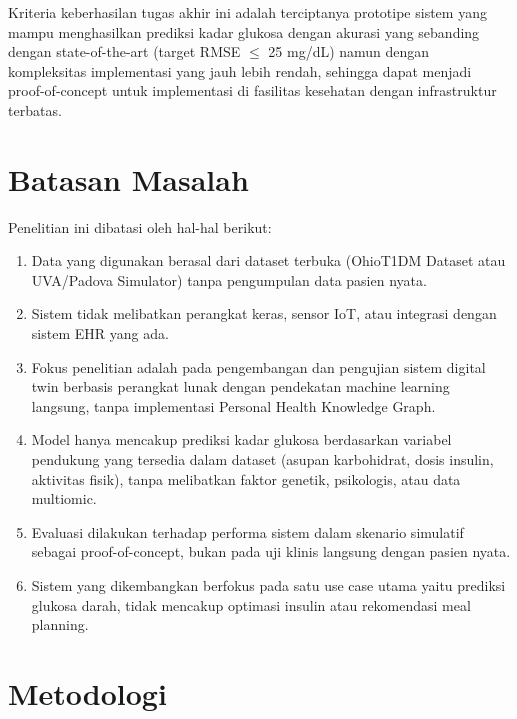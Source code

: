 \documentclass[12pt,a4paper,oneside]{book}
\begin{document}
Kriteria keberhasilan tugas akhir ini adalah terciptanya prototipe sistem yang mampu menghasilkan prediksi kadar glukosa dengan akurasi yang sebanding dengan state-of-the-art (target RMSE $\leq$ 25 mg/dL) namun dengan kompleksitas implementasi yang jauh lebih rendah, sehingga dapat menjadi proof-of-concept untuk implementasi di fasilitas kesehatan dengan infrastruktur terbatas.

\section{Batasan Masalah}

Penelitian ini dibatasi oleh hal-hal berikut:

\begin{enumerate}
    \item Data yang digunakan berasal dari dataset terbuka (OhioT1DM Dataset atau UVA/Padova Simulator) tanpa pengumpulan data pasien nyata.
    
    \item Sistem tidak melibatkan perangkat keras, sensor IoT, atau integrasi dengan sistem EHR yang ada.
    
    \item Fokus penelitian adalah pada pengembangan dan pengujian sistem digital twin berbasis perangkat lunak dengan pendekatan machine learning langsung, tanpa implementasi Personal Health Knowledge Graph.
    
    \item Model hanya mencakup prediksi kadar glukosa berdasarkan variabel pendukung yang tersedia dalam dataset (asupan karbohidrat, dosis insulin, aktivitas fisik), tanpa melibatkan faktor genetik, psikologis, atau data multiomic.
    
    \item Evaluasi dilakukan terhadap performa sistem dalam skenario simulatif sebagai proof-of-concept, bukan pada uji klinis langsung dengan pasien nyata.
    
    \item Sistem yang dikembangkan berfokus pada satu use case utama yaitu prediksi glukosa darah, tidak mencakup optimasi insulin atau rekomendasi meal planning.
\end{enumerate}

\section{Metodologi}
\end{document}
